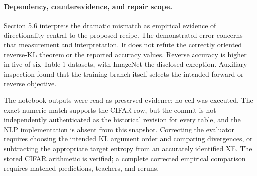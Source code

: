 \documentclass[10pt]{article}
\begin{document}
\paragraph*{Dependency, counterevidence, and repair scope.}\mbox{}\par
Section 5.6 interprets the dramatic mismatch as empirical evidence of directionality central to the proposed recipe. The demonstrated error concerns that measurement and interpretation. It does not refute the correctly oriented reverse-KL theorem or the reported accuracy values. Reverse accuracy is higher in five of six Table 1 datasets, with ImageNet the disclosed exception. Auxiliary inspection found that the training branch itself selects the intended forward or reverse objective.\par
The notebook outputs were read as preserved evidence; no cell was executed. The exact numeric match supports the CIFAR row, but the commit is not independently authenticated as the historical revision for every table, and the NLP implementation is absent from this snapshot. Correcting the evaluator requires choosing the intended KL argument order and comparing divergences, or subtracting the appropriate target entropy from an accurately identified XE. The stored CIFAR arithmetic is verified; a complete corrected empirical comparison requires matched predictions, teachers, and reruns.\par
\end{document}
